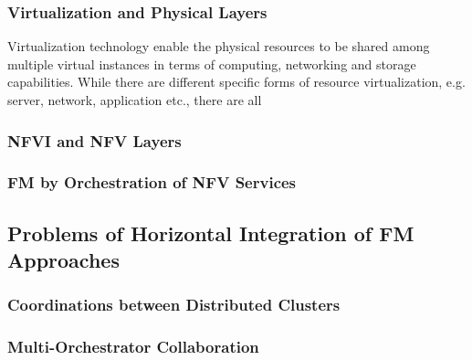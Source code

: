 \subsubsection{Virtualization and Physical Layers}

Virtualization technology enable the physical resources to be shared among
multiple virtual instances in terms of computing, networking and storage capabilities. 
While there are different specific forms of resource virtualization, e.g.
server, network, application etc., there are all 

\subsubsection{NFVI and NFV Layers}

\subsubsection{FM by Orchestration of NFV Services}

\subsection{Problems of Horizontal Integration of FM Approaches}

\subsubsection{Coordinations between Distributed Clusters}

\subsubsection{Multi-Orchestrator Collaboration}
